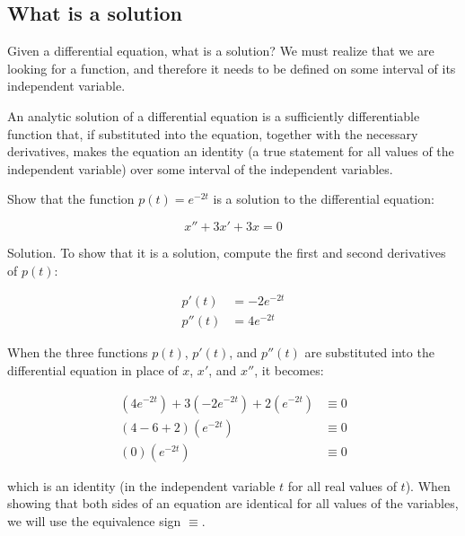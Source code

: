   \subsection{What is a solution}

    Given a differential equation, what is a solution? We must realize that we are looking for a function, and therefore it needs to be defined on some interval of its independent variable.

    \begin{definition}
      An analytic solution of a differential equation is a sufficiently differentiable function that, if substituted into the equation, together with the necessary derivatives, makes the equation an identity (a true statement for all values of the independent variable) over some interval of the independent variables.
    \end{definition}

    \begin{problem}
      Show that the function $p(t)=e^{-2t}$ is a solution to the differential equation:

      \[
        x'' + 3x' + 3x = 0
      \]
  
      Solution. To show that it is a solution, compute the first and second derivatives of $p(t)$:
  
      \begin{align*}
        p'(t) &=- 2e^{ - 2t}\\
        p''(t) &= 4e^{ - 2t}
      \end{align*}
  
      When the three functions $p(t)$, $p'(t)$, and $p''(t)$ are substituted into the differential equation in place of $x$, $x'$, and $x''$, it becomes:
  
      \begin{align*}
        (4e^{ - 2t}) + 3( - 2e^{ - 2t}) + 2(e^{ - 2t})&\equiv 0\\
        (4 - 6 + 2)(e^{ - 2t})&\equiv0\\
        (0)(e^{ - 2t})&\equiv0
      \end{align*}
  
      which is an identity (in the independent variable $t$ for all real values of $t$).
      When showing that both sides of an equation are identical for all values of the variables, we will use the equivalence sign $\equiv$.
    \end{problem}

